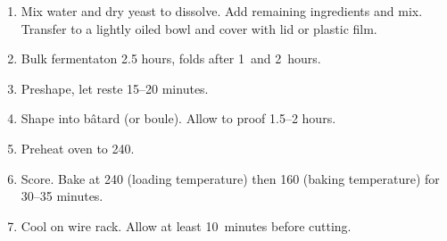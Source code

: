 
\begin{ingredients}
\end{ingredients}


\begin{recipe}
  \begin{enumerate}

  \item Mix water and dry yeast to dissolve.  Add remaining
    ingredients and mix.  Transfer to a lightly oiled bowl and cover
    with lid or plastic film.
    
  \item Bulk fermentaton 2.5 hours, folds after 1~and 2~hours.
    
  \item Preshape, let reste 15--20 minutes.
    
  \item Shape into bâtard (or boule).  Allow to proof 1.5--2 hours.
    
  \item Preheat oven to 240\degreeC.
    
  \item Score.  Bake at 240\degreeC{} (loading temperature) then
    160\degreeC{} (baking temperature) for 30--35 minutes.

  \item Cool on wire rack.  Allow at least 10~minutes before cutting.
    
  \end{enumerate}
\end{recipe}

